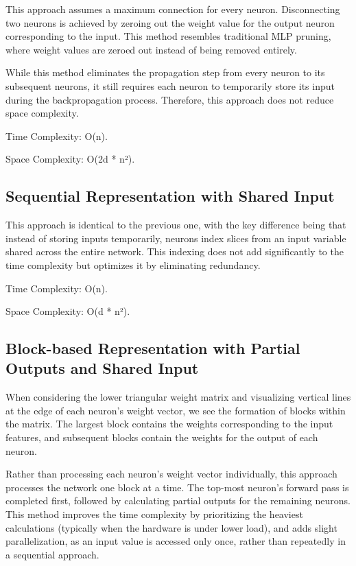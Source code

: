 This approach assumes a maximum connection for every neuron. Disconnecting two neurons is achieved by zeroing out the weight value for the output neuron corresponding to the input. This method resembles traditional MLP pruning, where weight values are zeroed out instead of being removed entirely.

While this method eliminates the propagation step from every neuron to its subsequent neurons, it still requires each neuron to temporarily store its input during the backpropagation process. Therefore, this approach does not reduce space complexity.

Time Complexity: O(n).

Space Complexity: O(2d * n²).

\subsection{Sequential Representation with Shared Input}
This approach is identical to the previous one, with the key difference being that instead of storing inputs temporarily, neurons index slices from an input variable shared across the entire network. This indexing does not add significantly to the time complexity but optimizes it by eliminating redundancy.

Time Complexity: O(n).

Space Complexity: O(d * n²).


\subsection{Block-based Representation with Partial Outputs and Shared Input}

When considering the lower triangular weight matrix and visualizing vertical lines at the edge of each neuron’s weight vector, we see the formation of blocks within the matrix. The largest block contains the weights corresponding to the input features, and subsequent blocks contain the weights for the output of each neuron.
 
Rather than processing each neuron’s weight vector individually, this approach processes the network one block at a time. The top-most neuron’s forward pass is completed first, followed by calculating partial outputs for the remaining neurons. This method improves the time complexity by prioritizing the heaviest calculations (typically when the hardware is under lower load), and adds slight parallelization, as an input value is accessed only once, rather than repeatedly in a sequential approach.

